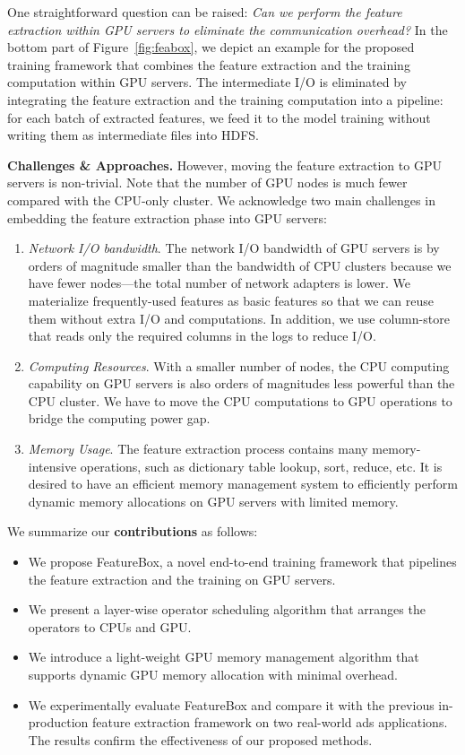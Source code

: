 \documentclass[sigconf]{acmart}
\begin{document}
One straightforward question can be raised: \textit{Can we perform the feature extraction within GPU servers to eliminate the communication overhead?} 
In the bottom part of Figure~\ref{fig:feabox}, we depict an example for the proposed training framework that combines the feature extraction and the training computation within GPU servers. The intermediate I/O is eliminated by integrating the feature extraction and the training computation into a pipeline: for each batch of extracted features, we feed it to the model training without writing them as intermediate files into HDFS.

\textbf{Challenges \& Approaches.} 
However, moving the feature extraction to GPU servers is non-trivial. 
Note that the number of GPU nodes is much fewer compared with the CPU-only cluster. We acknowledge two main challenges in embedding the feature extraction phase into GPU servers:
\begin{enumerate}
\item {\it Network I/O bandwidth}. The network I/O bandwidth of GPU servers is by orders of magnitude smaller than the bandwidth of CPU clusters because we have fewer nodes---the total number of network adapters is lower. We materialize frequently-used features as basic features so that we can reuse them without extra I/O and computations. In addition, we use column-store that reads only the required columns in the logs to reduce I/O.
\item {\it Computing Resources}. With a smaller number of nodes, the CPU computing capability on GPU servers is also orders of magnitudes less powerful than the CPU cluster. We have to move the CPU computations to GPU operations to bridge the computing power gap.
\item {\it Memory Usage}. The feature extraction process contains many memory-intensive operations, such as dictionary table lookup, sort, reduce, etc. It is desired to have an efficient memory management system to efficiently perform dynamic memory allocations on GPU servers with limited memory.
\end{enumerate}
We summarize our \textbf{contributions} as follows:
\begin{itemize}
\item We propose FeatureBox, a novel end-to-end training framework that pipelines the feature extraction and the training on GPU servers.
\item We present a layer-wise operator scheduling algorithm that arranges the operators to CPUs and GPU.
\item We introduce a light-weight GPU memory management algorithm that supports dynamic GPU memory allocation with minimal overhead.
\item We experimentally evaluate FeatureBox and compare it with the previous in-production feature extraction framework on two real-world ads applications. The results confirm the effectiveness of our proposed methods.
\end{itemize}
\end{document}
